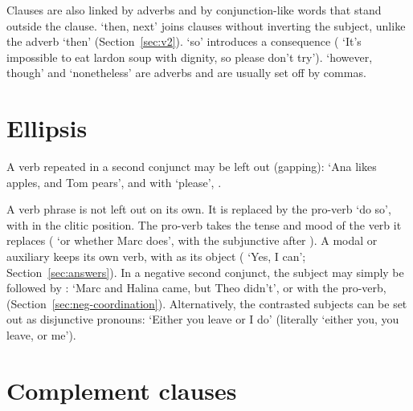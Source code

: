 Clauses are also linked by adverbs and by conjunction-like words that stand outside the clause.  `then, next' joins clauses without inverting the subject, unlike the adverb  `then' (Section~\ref{sec:v2}).  `so' introduces a consequence ( `It's impossible to eat lardon soup with dignity, so please don't try').  `however, though' and  `nonetheless' are adverbs and are usually set off by commas.

\section{Ellipsis}\label{sec:ellipsis}
A verb repeated in a second conjunct may be left out (gapping):  `Ana likes apples, and Tom pears', and with  `please', .

A verb phrase is not left out on its own. It is replaced by the pro-verb  `do so', with  in the clitic position. The pro-verb takes the tense and mood of the verb it replaces ( `or whether Marc does', with the subjunctive  after ). A modal or auxiliary keeps its own verb, with  as its object ( `Yes, I can'; Section~\ref{sec:answers}).
In a negative second conjunct, the subject may simply be followed by :  `Marc and Halina came, but Theo didn't', or with the pro-verb,  (Section~\ref{sec:neg-coordination}). Alternatively, the contrasted subjects can be set out as disjunctive pronouns:  `Either you leave or I do' (literally `either you, you leave, or me').

\section{Complement clauses}\label{sec:complement-clauses}

